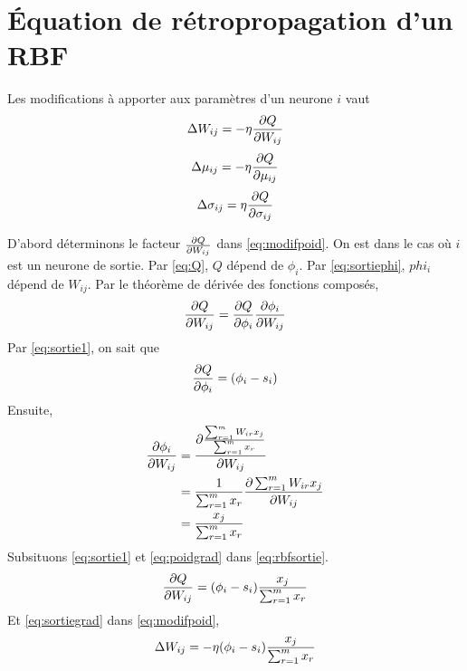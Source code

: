 \section{Équation de rétropropagation d'un RBF}\label{sec:eqrbf}
Les modifications à apporter aux paramètres d'un neurone $i$ vaut
\begin{equation}\label{eq:modifpoid}
 \Delta W_{ij} = -\eta \frac{\partial Q}{\partial W_{ij}}
\end{equation}
\begin{equation}\label{eq:modifmu}
 \Delta \mu_{ij} = -\eta \frac{\partial Q}{\partial \mu_{ij}}
\end{equation}
\begin{equation}\label{eq:modifsigma}
 \Delta \sigma_{ij} = \eta \frac{\partial Q}{\partial \sigma_{ij}}
\end{equation}

D'abord déterminons le facteur $\frac{\partial Q}{\partial W_{ij}}$ dans \eqref{eq:modifpoid}.
On est dans le cas où $i$ est un neurone de sortie.
Par \eqref{eq:Q}, $Q$ dépend de $\phi_i$.
Par \eqref{eq:sortiephi}, $phi_i$ dépend de $W_{ij}$.
Par le théorème de dérivée des fonctions composés,
\begin{equation}\label{eq:rbfsortie}
 \frac{\partial Q}{\partial W_{ij}} = \frac{\partial Q}{\partial \phi_i} \frac{\partial \phi_i}{\partial W_{ij}}
\end{equation}
Par \eqref{eq:sortie1}, on sait que
\[\frac{\partial Q}{\partial \phi_i} = (\phi_i - s_i)\]
Ensuite,
\begin{equation}\label{eq:poidgrad}
 \begin{split}
  \frac{\partial \phi_i}{\partial W_{ij}} & = \frac{\partial \frac{\sum_{r=1}^{m}W_{ir}x_{j}}{\sum_{r=1}^{m}x_{r}}}{\partial W_{ij}}\\
  ~ & = \frac{1}{\sum_{r=1}^{m}x_{r}} \frac{\partial \sum_{r=1}^{m}W_{ir}x_{j}}{\partial W_{ij}}\\
  ~ & = \frac{x_j}{\sum_{r=1}^{m}x_{r}}
 \end{split}
\end{equation}
Subsituons \eqref{eq:sortie1} et \eqref{eq:poidgrad} dans \eqref{eq:rbfsortie}.
\begin{equation}\label{eq:sortiegrad}
 \frac{\partial Q}{\partial W_{ij}} = (\phi_i - s_i) \frac{x_j}{\sum_{r=1}^{m}x_{r}}
\end{equation}
Et \eqref{eq:sortiegrad} dans \eqref{eq:modifpoid},
\[\Delta W_{ij} = -\eta (\phi_i - s_i) \frac{x_j}{\sum_{r=1}^{m}x_{r}}\]\\

